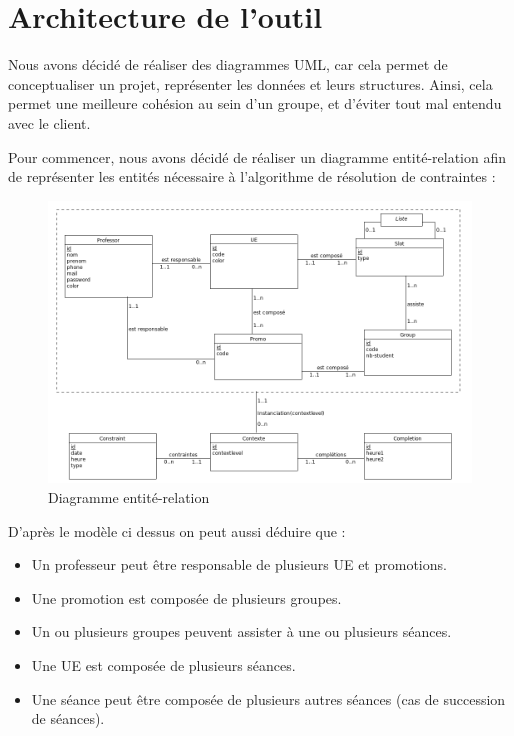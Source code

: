 \documentclass[12pt,a4paper,openany]{memoir}
\begin{document}
\section{Architecture de l'outil}
\par
Nous avons décidé de réaliser des diagrammes UML, car cela permet de conceptualiser un projet, représenter les données et leurs structures. Ainsi, cela permet une meilleure cohésion au sein d'un groupe, et d'éviter tout mal entendu avec le client. \par
Pour commencer, nous avons décidé de réaliser un diagramme entité-relation afin de représenter les entités nécessaire à l'algorithme de résolution de contraintes : 
\begin{figure}[H]
    \includegraphics[width=19cm, center]{img/BDD_edt.png}
    \caption{Diagramme entité-relation}
\end{figure}
\par
D'après le modèle ci dessus on peut aussi déduire que : 
\begin{itemize}
    \item Un professeur peut être responsable de plusieurs UE et promotions.
    \item Une promotion est composée de plusieurs groupes.
    \item Un ou plusieurs groupes peuvent assister à une ou plusieurs séances.
    \item Une UE est composée de plusieurs séances.
    \item Une séance peut être composée de plusieurs autres séances (cas de succession de séances).
\end{itemize}
\medbreak
\end{document}
